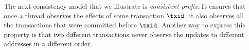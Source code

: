  

 


The next consistency model that we illustrate is \emph{consistent prefix}. 
It ensures that once a thread observes the effects of some transaction $\txid$, it also observes all the transactions that were committed before $\txid$. 
Another way to express this property is that two different transactions never observe the updates to different addresses in a different order.

